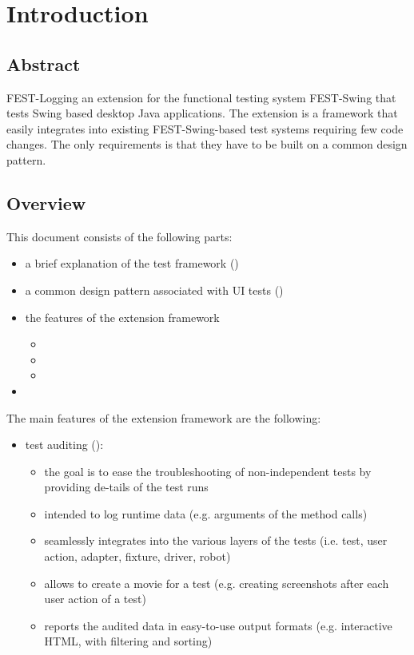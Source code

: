 
\chapter{Introduction}\label{chap:intro}

\section{Abstract}\label{sec:abstract}

FEST-Logging an extension for the functional testing system FEST-Swing that tests Swing based desktop Java applications. The extension is a framework that easily integrates into existing FEST-Swing-based test systems requiring few code changes. The only requirements is that they have to be built on a common design pattern.

\section{Overview}\label{sec:overview}

This document consists of the following parts:
\begin{itemize}
\item a brief explanation of the test framework ()
\item a common design pattern associated with UI tests ()
\item the features of the extension framework
	\begin{itemize}
	\item {}
	\item {}
	\item {}
	\end{itemize}
\item {}
\end{itemize}

\noindent The main features of the extension framework are the following:
\begin{itemize}
\item test auditing ():
	\begin{itemize}
	\item the goal is to ease the troubleshooting of non-independent tests by providing de-tails of the test runs
	\item intended to log runtime data (e.g. arguments of the method calls)
	\item seamlessly integrates into the various layers of the tests (i.e. test, user action, adapter, fixture, driver, robot)
	\item allows to create a movie for a test (e.g. creating screenshots after each user action of a test)
	\item reports the audited data in easy-to-use output formats (e.g. interactive HTML, with filtering and sorting)
	\end{itemize}
\end{itemize}

